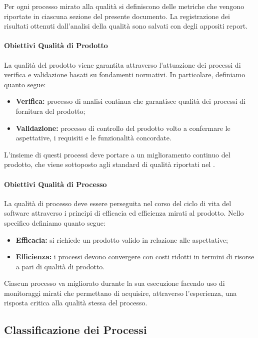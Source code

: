		Per ogni processo mirato alla qualità si definiscono delle metriche che vengono riportate in ciascuna sezione del presente documento.
		La registrazione dei risultati ottenuti dall'analisi della qualità sono salvati con degli appositi report.

		\paragraph{Obiettivi Qualità di Prodotto}

			La qualità del prodotto viene garantita attraverso l'attuazione dei processi di verifica e validazione basati su fondamenti normativi. In particolare, definiamo quanto segue:
			\begin{itemize}
				\item \textbf{Verifica:} processo di analisi continua che garantisce qualità dei processi di fornitura del prodotto;
				\item \textbf{Validazione:} processo di controllo del prodotto volto a confermare le aspettative, i requisiti e le funzionalità concordate.
			\end{itemize}

			L'insieme di questi processi deve portare a un miglioramento continuo del prodotto, che viene sottoposto agli standard di qualità riportati nel .

		\paragraph{Obiettivi Qualità di Processo}

			La qualità di processo deve essere perseguita nel corso del ciclo di vita del software attraverso i principi di efficacia ed efficienza mirati al prodotto.
			Nello specifico definiamo quanto segue:
			\begin{itemize}
				\item \textbf{Efficacia:} si richiede un prodotto valido in relazione alle aspettative;
				\item \textbf{Efficienza:} i processi devono convergere con costi ridotti in termini di risorse a pari di qualità di prodotto.
			\end{itemize}

			Ciascun processo va migliorato durante la sua esecuzione facendo uso di monitoraggi mirati che permettano di acquisire, attraverso l'esperienza, una risposta critica alla qualità stessa del processo.

	\subsection{Classificazione dei Processi}

